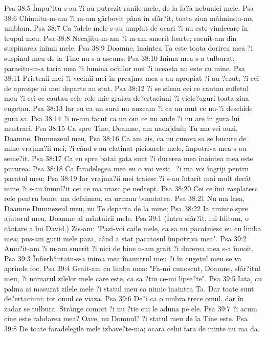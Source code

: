 Psa 38:5  Împu?itu-s-au ?i au putrezit ranile mele, de la fa?a nebuniei mele.
Psa 38:6  Chinuitu-m-am ?i m-am gârbovit pâna în sfâr?it, toata ziua mâhnindu-ma umblam.
Psa 38:7  Ca ?alele mele s-au umplut de ocari ?i nu este vindecare în trupul meu.
Psa 38:8  Necajitu-m-am ?i m-am smerit foarte; racnit-am din suspinarea inimii mele.
Psa 38:9  Doamne, înaintea Ta este toata dorirea mea ?i suspinul meu de la Tine nu s-a ascuns.
Psa 38:10  Inima mea s-a tulburat, parasitu-m-a taria mea ?i lumina ochilor mei ?i aceasta nu este cu mine.
Psa 38:11  Prietenii mei ?i vecinii mei în preajma mea s-au apropiat ?i au ?ezut; ?i cei de aproape ai mei departe au stat.
Psa 38:12  ?i se sileau cei ce cautau sufletul meu ?i cei ce cautau cele rele mie graiau de?ertaciuni ?i vicle?uguri toata ziua cugetau.
Psa 38:13  Iar eu ca un surd nu auzeam ?i ca un mut ce nu-?i deschide gura sa.
Psa 38:14  ?i m-am facut ca un om ce nu aude ?i nu are în gura lui mustrari.
Psa 38:15  Ca spre Tine, Doamne, am nadajduit; Tu ma vei auzi, Doamne, Dumnezeul meu,
Psa 38:16  Ca am zis, ca nu cumva sa se bucure de mine vrajma?ii mei; ?i când s-au clatinat picioarele mele, împotriva mea s-au seme?it.
Psa 38:17  Ca eu spre batai gata sunt ?i durerea mea înaintea mea este pururea.
Psa 38:18  Ca faradelegea mea eu o voi vesti  ?i ma voi îngriji pentru pacatul meu;
Psa 38:19  Iar vrajma?ii mei traiesc ?i s-au întarit mai mult decât mine ?i s-au înmul?it cei ce ma urasc pe nedrept.
Psa 38:20  Cei ce îmi rasplatesc rele pentru bune, ma defaimau, ca urmam bunatatea.
Psa 38:21  Nu ma lasa, Doamne Dumnezeul meu, nu Te departa de la mine;
Psa 38:22  Ia aminte spre ajutorul meu, Doamne al mântuirii mele.
Psa 39:1  (Întru sfâr?it, lui Iditum, o cântare a lui David.) Zis-am: "Pazi-voi caile mele, ca sa nu pacatuiesc eu cu limba mea; pus-am gurii mele paza, când a stat pacatosul împotriva mea".
Psa 39:2  Amu?it-am ?i m-am smerit ?i nici de bine n-am grait ?i durerea mea s-a înnoit.
Psa 39:3  Înfierbântatu-s-a inima mea înauntrul meu ?i în cugetul meu se va aprinde foc.
Psa 39:4  Grait-am cu limba mea: "Fa-mi cunoscut, Doamne, sfâr?itul meu, ?i numarul zilelor mele care este, ca sa ?tiu ce-mi lipse?te".
Psa 39:5  Iata, cu palma ai masurat zilele mele ?i statul meu ca nimic înaintea Ta. Dar toate sunt de?ertaciuni; tot omul ce viaza.
Psa 39:6  De?i ca o umbra trece omul, dar în zadar se tulbura. Strânge comori ?i nu ?tie cui le aduna pe ele.
Psa 39:7  ?i acum cine este rabdarea mea? Oare, nu Domnul? ?i statul meu de la Tine este.
Psa 39:8  De toate faradelegile mele izbave?te-ma; ocara celui fara de minte nu ma da.
